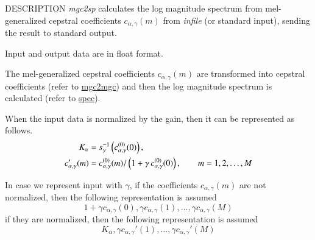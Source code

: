 \begin{synopsis}
\item[mgc2sp] [ --a $A$ ] [ --g $G$ ] [ --c $C$ ] [ --m $M$ ]
               [ --n ] [ --u ] [ --l $L$ ] [ --p ]
\item[\ ~~~~~] [ --o $O$ ] [ {\em infile} ]
\end{synopsis}

\begin{qsection}{DESCRIPTION}
{\em mgc2sp} calculates the log magnitude spectrum 
from mel-generalized cepstral coefficients $c_{\alpha, \gamma}(m)$
from {\em infile} (or standard input),
sending the result to standard output.

Input and output data are in float format.

The mel-generalized cepstral coefficients $c_{\alpha, \gamma}(m)$
are transformed into cepstral coefficients
(refer to \hyperlink{mgc2mgc}{mgc2mgc})
and then the log magnitude spectrum is calculated 
(refer to \hyperlink{spec}{spec}).

When the input data is normalized by the gain,
then it can be represented as follows.
\begin{align}
K_{\alpha} &= 
        s_{\gamma}^{-1}\left(c_{\alpha,\gamma}^{(0)}(0)\right), \notag \\
c_{\alpha,\gamma}'(m) &=
          c_{\alpha,\gamma}^{(0)}(m)/\left(1+\gamma\,
          c_{\alpha,\gamma}^{(0)}(0)\right), \qquad m = 1,2,\dots, M \notag
\end{align}

In case we represent input with $\gamma$,
if the coefficients $c_{\alpha,\gamma}(m)$ are not normalized, then
the following representation is assumed
\begin{displaymath}
1+\gamma c_{\alpha,\gamma}(0), \gamma c_{\alpha,\gamma}(1), \dots, \gamma c_{\alpha,\gamma}(M)
\end{displaymath}
if they are normalized, then
the following representation is assumed
\begin{displaymath}
K_\alpha,\gamma c_{\alpha,\gamma}'(1),\dots, \gamma c_{\alpha,\gamma}'(M)
\end{displaymath}

\end{qsection}

